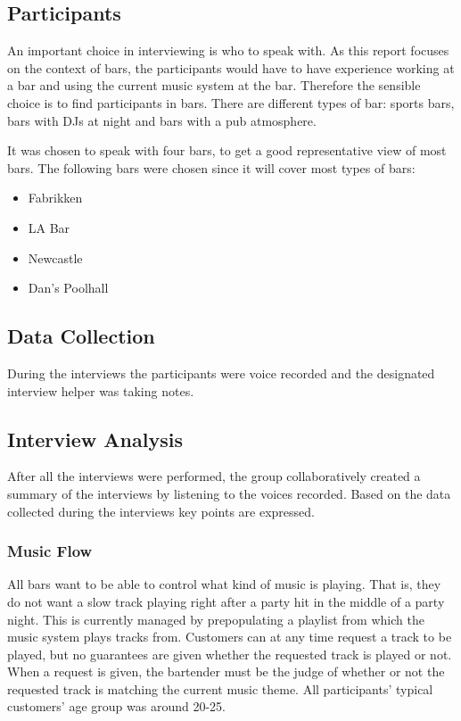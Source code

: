\subsection{Participants}

An important choice in interviewing is who to speak with. As this report focuses on the context of bars, the participants would have to have experience working at a bar and using the current music system at the bar. Therefore the sensible choice is to find participants in bars. There are different types of bar: sports bars, bars with DJs at night and bars with a pub atmosphere.

It was chosen to speak with four bars, to get a good representative view of most bars. The following bars were chosen since it will cover most types of bars:

\begin{itemize}
  \item Fabrikken
  \item LA Bar
  \item Newcastle
  \item Dan's Poolhall
\end{itemize}

\subsection{Data Collection}
\label{sub:data_collection}

During the interviews the participants were voice recorded and the designated interview helper was taking notes.

\subsection{Interview Analysis}
\label{sub:interview_analysis}

After all the interviews were performed, the group collaboratively created a summary of the interviews by listening to the voices recorded. Based on the data collected during the interviews key points are expressed.

\subsubsection{Music Flow}
\label{ssub:Music Flow}


All bars want to be able to control what kind of music is playing. That is, they do not want a slow track playing right after a party hit in the middle of a party night. This is currently managed by prepopulating a playlist from which the music system plays tracks from. Customers can at any time request a track to be played, but no guarantees are given whether the requested track is played or not. When a request is given, the bartender must be the judge of whether or not the requested track is matching the current music theme. All participants' typical customers' age group was around 20-25.

